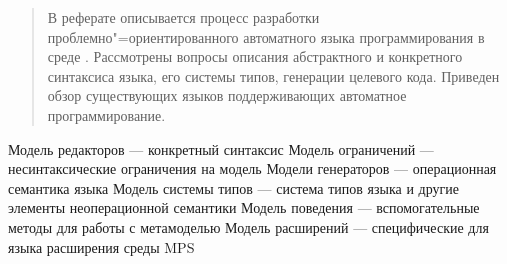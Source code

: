 \documentclass[a4paper,12pt]{article}
\begin{document}

\begin{abstract}
В реферате описывается процесс разработки проблемно"=ориентированного автоматного языка программирования в среде \MPS{}. Рассмотрены вопросы описания абстрактного и конкретного синтаксиса языка, его системы типов, генерации целевого кода. Приведен обзор существующих языков поддерживающих автоматное программирование.
\end{abstract}

\tableofcontents












\TBD Модель редакторов — конкретный синтаксис
\TBD Модель ограничений — несинтаксические ограничения на модель
\TBD Модели генераторов — операционная семантика языка
\TBD Модель системы типов — система типов языка и другие элементы неоперационной семантики
\TBD Модель поведения — вспомогательные методы для работы с метамоделью
\TBD Модель расширений — специфические для языка расширения среды MPS


\end{document}
